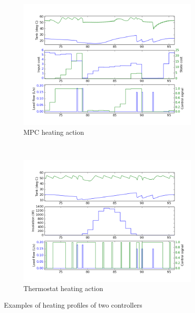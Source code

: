\begin{figure}
   \centering
   \begin{subfigure}[b]{0.85\textwidth}
      \includegraphics[width=\textwidth]{results/mpc-comparison-6-1}
      \caption{MPC heating action}
      \label{fig:mpc-comparison}
   \end{subfigure}
   \\ %
   \begin{subfigure}[b]{0.85\textwidth}
      \includegraphics[width=\textwidth]{results/thermostat-comparison-6-1}
      \caption{Thermostat heating action}
      \label{fig:thermostat-comparison}
   \end{subfigure}
   \caption{Examples of heating profiles of two controllers}
   \label{fig:profile-comparison}
\end{figure}

